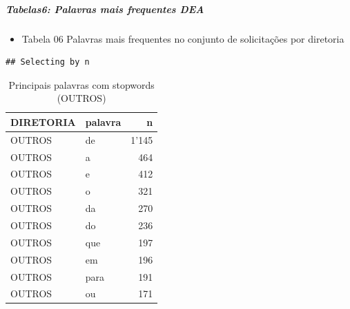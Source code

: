 \documentclass[]{article}
\newenvironment{Shaded}{\begin{snugshade}}{\end{snugshade}}
\newcommand{\KeywordTok}[1]{\textcolor[rgb]{0.13,0.29,0.53}{\textbf{#1}}}
\newcommand{\DataTypeTok}[1]{\textcolor[rgb]{0.13,0.29,0.53}{#1}}
\newcommand{\DecValTok}[1]{\textcolor[rgb]{0.00,0.00,0.81}{#1}}
\newcommand{\StringTok}[1]{\textcolor[rgb]{0.31,0.60,0.02}{#1}}
\newcommand{\OperatorTok}[1]{\textcolor[rgb]{0.81,0.36,0.00}{\textbf{#1}}}
\newcommand{\NormalTok}[1]{#1}
\providecommand{\tightlist}{%
  \setlength{\itemsep}{0pt}\setlength{\parskip}{0pt}}
\let\oldsubparagraph\subparagraph
\renewcommand{\subparagraph}[1]{\oldsubparagraph{#1}\mbox{}}
\begin{document}
\subparagraph{Tabelas6: Palavras mais frequentes
DEA}\label{tabelas6-palavras-mais-frequentes-dea}

\begin{itemize}
\tightlist
\item
  Tabela 06 Palavras mais frequentes no conjunto de solicitações por
  diretoria
\end{itemize}

\begin{Shaded}
\end{Shaded}

\begin{verbatim}
## Selecting by n
\end{verbatim}

\begin{table}[!h]

\caption{\label{tab:unnamed-chunk-24}Principais palavras com stopwords (OUTROS)}
\centering
\begin{tabular}{llr}
\toprule
DIRETORIA & palavra & n\\
\midrule
\rowcolor{gray!6}  OUTROS & de & 1'145\\
OUTROS & a & 464\\
\rowcolor{gray!6}  OUTROS & e & 412\\
OUTROS & o & 321\\
\rowcolor{gray!6}  OUTROS & da & 270\\
\addlinespace
OUTROS & do & 236\\
\rowcolor{gray!6}  OUTROS & que & 197\\
OUTROS & em & 196\\
\rowcolor{gray!6}  OUTROS & para & 191\\
OUTROS & ou & 171\\
\bottomrule
\end{tabular}
\end{table}
\end{document}
